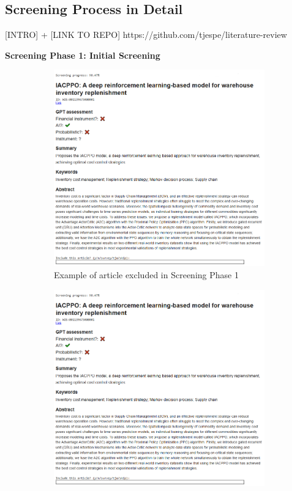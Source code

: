 \subsection{Screening Process in Detail}
\label{appendix:screening_process_with_ai}

[INTRO] + [LINK TO REPO] https://github.com/tjespe/literature-review

\textbf{Screening Phase 1: Initial Screening}

\begin{figure}[H]
     \centering
     \begin{subfigure}[b]{0.49\textwidth}
         \centering
         \includegraphics[width=\textwidth]{Images/screening_a.png}
         \caption{Example of article excluded in Screening Phase 1}
         \label{fig:screening_phase_1_rejected}
     \end{subfigure}
     \hfill
     \begin{subfigure}[b]{0.49\textwidth}
         \centering
         \includegraphics[width=\textwidth]{Images/screening_a.png}

\end{subfigure}
\end{figure}
